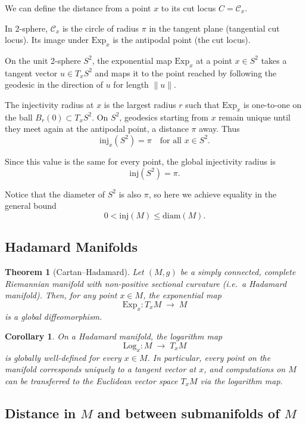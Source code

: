 \documentclass{article}
\newtheorem{theorem}{Theorem}
\newtheorem{corollary}{Corollary}
\begin{document}
We can define the distance from a point $x$ to its cut locus $C = \mathcal{C}_x$.

In 2-sphere, $\mathcal{C}_x$ is the circle of radius $\pi$ in the tangent plane (tangential cut locus).
Its image under $\textrm{Exp}_x$ is the antipodal point (the cut locus).


On the unit 2-sphere $S^2$, the exponential map $\mathrm{Exp}_x$ at a point $x \in S^2$ takes a tangent vector $u \in T_xS^2$ 
and maps it to the point reached by following the geodesic in the direction of $u$ for length $\|u\|$. 

The injectivity radius at $x$ is the largest radius $r$ such that $\mathrm{Exp}_x$ is one-to-one on the ball $B_r(0) \subset T_xS^2$. 
On $S^2$, geodesics starting from $x$ remain unique until they meet again at the antipodal point, a distance $\pi$ away. 
Thus
\[
\mathrm{inj}_x(S^2) = \pi \quad \text{for all } x \in S^2.
\]

Since this value is the same for every point, the global injectivity radius is
\[
\mathrm{inj}(S^2) = \pi.
\]

Notice that the diameter of $S^2$ is also $\pi$, so here we achieve equality in the general bound
\[
0 < \mathrm{inj}(M) \leq \mathrm{diam}(M).
\]


\subsection{Hadamard Manifolds}

\begin{theorem}[Cartan--Hadamard]
Let $(M,g)$ be a simply connected, complete Riemannian manifold with non-positive sectional curvature (i.e.\ a Hadamard manifold). 
Then, for any point $x \in M$, the exponential map
\[
\mathrm{Exp}_x : T_xM \;\to\; M
\]
is a global diffeomorphism. 
\end{theorem}

\begin{corollary}
On a Hadamard manifold, the logarithm map
\[
\mathrm{Log}_x : M \;\to\; T_xM
\]
is globally well-defined for every $x \in M$. 
In particular, every point on the manifold corresponds uniquely to a tangent vector at $x$, and computations on $M$ can be transferred to the Euclidean vector space $T_xM$ via the logarithm map.
\end{corollary}

\subsection{Distance in $M$ and between submanifolds of $M$}
\end{document}
